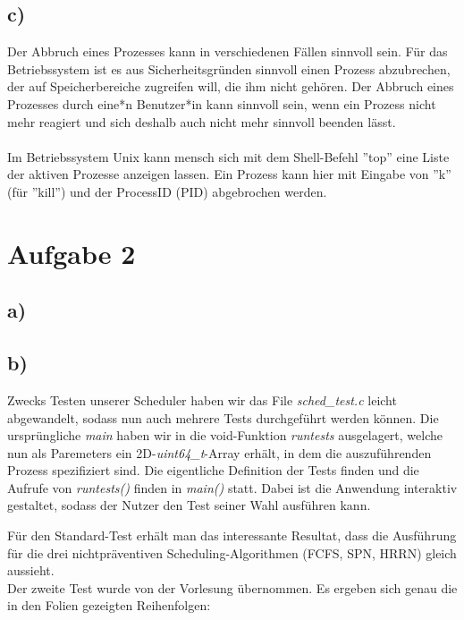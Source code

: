 \documentclass[numbers=noendperiod]{scrartcl}
\begin{document}
\subsection*{c)}
Der Abbruch eines Prozesses kann in verschiedenen Fällen sinnvoll sein. Für das Betriebssystem ist es aus Sicherheitsgründen sinnvoll einen Prozess abzubrechen, der auf Speicherbereiche zugreifen will, die ihm nicht gehören. Der Abbruch eines Prozesses durch eine*n Benutzer*in kann sinnvoll sein, wenn ein Prozess nicht mehr reagiert und sich deshalb auch nicht mehr sinnvoll beenden lässt. \\\\
Im Betriebssystem Unix kann mensch sich mit dem Shell-Befehl ''top'' eine Liste der aktiven Prozesse anzeigen lassen. Ein Prozess kann hier mit Eingabe von ''k'' (für ''kill'') und der ProcessID (PID) abgebrochen werden. 
\section{Aufgabe 2}
\subsection*{a)}


\subsection*{b)}

Zwecks Testen unserer Scheduler haben wir das File \textit{sched\_test.c} leicht abgewandelt, sodass nun auch mehrere Tests durchgeführt werden können. Die ursprüngliche \textit{main} haben wir in die void-Funktion \textit{runtests} ausgelagert, welche nun als Paremeters ein 2D-\textit{uint64\_t}-Array erhält, in dem die auszuführenden Prozess spezifiziert sind. Die eigentliche Definition der Tests finden und die Aufrufe von \textit{runtests()} finden in \textit{main()} statt. Dabei ist die Anwendung interaktiv gestaltet, sodass der Nutzer den Test seiner Wahl ausführen kann.


Für den Standard-Test erhält man das interessante Resultat, dass die Ausführung für die drei nichtpräventiven Scheduling-Algorithmen (FCFS, SPN, HRRN) gleich aussieht.\\

Der zweite Test wurde von der Vorlesung übernommen. Es ergeben sich genau die in den Folien gezeigten Reihenfolgen:\\
\end{document}
